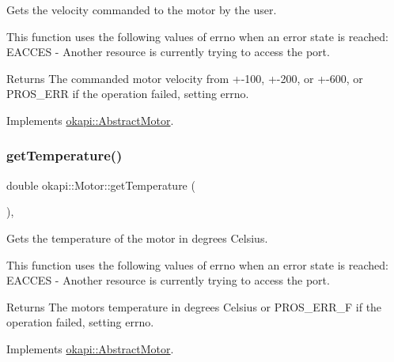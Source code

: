 Gets the velocity commanded to the motor by the user.

This function uses the following values of errno when an error state is reached\+: E\+A\+C\+C\+ES -\/ Another resource is currently trying to access the port.

\begin{DoxyReturn}{Returns}
The commanded motor velocity from +-\/100, +-\/200, or +-\/600, or P\+R\+O\+S\+\_\+\+E\+RR if the operation failed, setting errno. 
\end{DoxyReturn}


Implements \mbox{\hyperlink{classokapi_1_1AbstractMotor_a96b02cca7b51f75c01d2d22aab474fe4}{okapi\+::\+Abstract\+Motor}}.

\mbox{\label{classokapi_1_1Motor_ab5b9208b001c1ab49f8c058eff58e5b3}} 
\subsubsection{\texorpdfstring{getTemperature()}{getTemperature()}}
{\footnotesize\ttfamily double okapi\+::\+Motor\+::get\+Temperature (\begin{DoxyParamCaption}{ }\end{DoxyParamCaption})\hspace{0.3cm}{\ttfamily [override]}, {\ttfamily [virtual]}}

Gets the temperature of the motor in degrees Celsius.

This function uses the following values of errno when an error state is reached\+: E\+A\+C\+C\+ES -\/ Another resource is currently trying to access the port.

\begin{DoxyReturn}{Returns}
The motor\textquotesingle{}s temperature in degrees Celsius or P\+R\+O\+S\+\_\+\+E\+R\+R\+\_\+F if the operation failed, setting errno. 
\end{DoxyReturn}


Implements \mbox{\hyperlink{classokapi_1_1AbstractMotor_a96ef2dc7eeb1ac23713e3e37af9e95f2}{okapi\+::\+Abstract\+Motor}}.

\mbox{\label{classokapi_1_1Motor_a4a8c14c49ae44d687772ff41591fdf1d}} 
